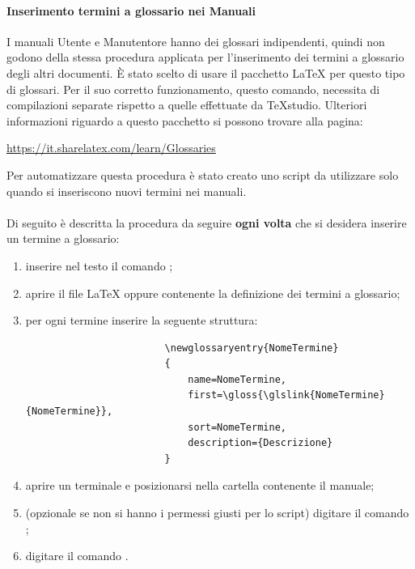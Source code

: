         	\paragraph{Inserimento termini a glossario nei Manuali}
        	I manuali Utente e Manutentore hanno dei glossari indipendenti, quindi non godono della stessa procedura applicata per l'inserimento dei termini a glossario degli altri documenti.
        	È stato scelto di usare il pacchetto \LaTeX {} per questo tipo di glossari. Per il suo corretto funzionamento, questo comando, necessita di compilazioni separate rispetto a quelle effettuate da TeXstudio. Ulteriori informazioni riguardo a questo pacchetto si possono trovare alla pagina:
        	\begin{center}
        		\url{https://it.sharelatex.com/learn/Glossaries}
        	\end{center}
        	Per automatizzare questa procedura è stato creato uno script  da utilizzare solo quando si inseriscono nuovi termini nei manuali. \\ \\
        	Di seguito è descritta la procedura da seguire \textbf{ogni volta} che si desidera inserire un termine a glossario: 
        	\begin{enumerate}
        		\item inserire nel testo il comando ;
        		\item aprire il file \LaTeX {} oppure  contenente la definizione dei termini a glossario;
        		\item per ogni termine inserire la seguente struttura:
        			\begin{verbatim}
	        			\newglossaryentry{NomeTermine}
	        			{
	        				name=NomeTermine,
	        				first=\gloss{\glslink{NomeTermine}{NomeTermine}},
	        				sort=NomeTermine,
	        				description={Descrizione}
	        			}
        			\end{verbatim}
        		\item aprire un terminale e posizionarsi nella cartella contenente il manuale;
        		\item (opzionale se non si hanno i permessi giusti per lo script) digitare il comando ;
        		\item digitare il comando .
        	\end{enumerate}
